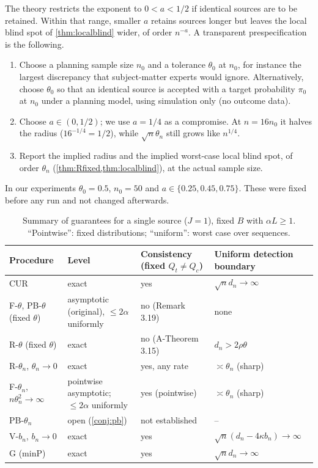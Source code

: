 \documentclass[11pt,a4paper]{article}
\begin{document}
The theory restricts the exponent to $0<a<1/2$ if identical sources are to be retained. Within that range, smaller $a$ retains sources longer but leaves the local blind spot of \cref{thm:localblind} wider, of order $n^{-a}$. A transparent prespecification is the following.
\begin{enumerate}[leftmargin=1.4em,itemsep=1pt]
\item Choose a planning sample size $n_0$ and a tolerance $\theta_0$ at $n_0$, for instance the largest discrepancy that subject-matter experts would ignore. Alternatively, choose $\theta_0$ so that an identical source is accepted with a target probability $\pi_0$ at $n_0$ under a planning model, using simulation only (no outcome data).
\item Choose $a\in(0,1/2)$; we use $a=1/4$ as a compromise. At $n=16n_0$ it halves the radius ($16^{-1/4}=1/2$), while $\sqrt n\theta_n$ still grows like $n^{1/4}$.
\item Report the implied radius and the implied worst-case local blind spot, of order $\theta_n$ (\cref{thm:Rfixed,thm:localblind}), at the actual sample size.
\end{enumerate}
In our experiments $\theta_0=0.5$, $n_0=50$ and $a\in\{0.25,0.45,0.75\}$. These were fixed before any run and not changed afterwards.

\begin{table}[t]
\centering\small
\caption{Summary of guarantees for a single source ($J=1$), fixed $B$ with $\alpha L\ge1$. ``Pointwise'': fixed distributions; ``uniform'': worst case over sequences.}\label{tab:summary}
\begin{tabular}{@{}p{3.2cm}p{3.1cm}p{3.6cm}p{3.6cm}@{}}
\toprule
Procedure & Level & Consistency (fixed $Q_t\neq Q_c$) & Uniform detection boundary\\
\midrule
CUR & exact & yes & $\sqrt n d_n\to\infty$\\
F-$\theta$, PB-$\theta$ (fixed $\theta$) & asymptotic (original), $\le2\alpha$ uniformly & no (Remark 3.19) & none\\
R-$\theta$ (fixed $\theta$) & exact & no (A-Theorem 3.15) & $d_n>2\rho\theta$\\
R-$\theta_n$, $\theta_n\to0$ & exact & yes, any rate & $\asymp\theta_n$ (sharp)\\
F-$\theta_n$, $n\theta_n^2\to\infty$ & pointwise asymptotic; $\le2\alpha$ uniformly & yes (pointwise) & $\asymp\theta_n$ (sharp)\\
PB-$\theta_n$ & open (\cref{conj:pb}) & not established & --\\
V-$b_n$, $b_n\to0$ & exact & yes & $\sqrt n(d_n-4\kappa b_n)\to\infty$\\
G (minP) & exact & yes & $\sqrt nd_n\to\infty$\\
\bottomrule
\end{tabular}
\end{table}
\end{document}

